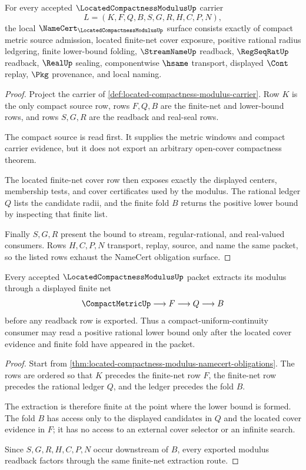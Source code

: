 \begin{theorem}
\label{thm:located-compactness-modulus-namecert-obligations}
For every accepted $\LocatedCompactnessModulusUp$ carrier
$$
L=(K,F,Q,B,S,G,R,H,C,P,N),
$$
the local $\NameCert_{\LocatedCompactnessModulusUp}$ surface consists exactly of compact metric source admission, located finite-net cover exposure, positive rational radius ledgering, finite lower-bound folding, $\StreamNameUp$ readback, $\RegSeqRatUp$ readback, $\RealUp$ sealing, componentwise $\hsame$ transport, displayed $\Cont$ replay, $\Pkg$ provenance, and local naming.
\end{theorem}
\begin{proof}
Project the carrier of \autoref{def:located-compactness-modulus-carrier}. Row $K$ is the only compact source row, rows $F,Q,B$ are the finite-net and lower-bound rows, and rows $S,G,R$ are the readback and real-seal rows.

The compact source is read first. It supplies the metric windows and compact carrier evidence, but it does not export an arbitrary open-cover compactness theorem.

The located finite-net cover row then exposes exactly the displayed centers, membership tests, and cover certificates used by the modulus. The rational ledger $Q$ lists the candidate radii, and the finite fold $B$ returns the positive lower bound by inspecting that finite list.

Finally $S,G,R$ present the bound to stream, regular-rational, and real-valued consumers. Rows $H,C,P,N$ transport, replay, source, and name the same packet, so the listed rows exhaust the NameCert obligation surface.
\end{proof}

\begin{theorem}
\label{thm:located-compactness-modulus-finite-net-extraction}
Every accepted $\LocatedCompactnessModulusUp$ packet extracts its modulus through a displayed finite net
$$
\CompactMetricUp \longrightarrow F \longrightarrow Q \longrightarrow B
$$
before any readback row is exported. Thus a compact-uniform-continuity consumer may read a positive rational lower bound only after the located cover evidence and finite fold have appeared in the packet.
\end{theorem}
\begin{proof}
Start from \autoref{thm:located-compactness-modulus-namecert-obligations}. The rows are ordered so that $K$ precedes the finite-net row $F$, the finite-net row precedes the rational ledger $Q$, and the ledger precedes the fold $B$.

The extraction is therefore finite at the point where the lower bound is formed. The fold $B$ has access only to the displayed candidates in $Q$ and the located cover evidence in $F$; it has no access to an external cover selector or an infinite search.

Since $S,G,R,H,C,P,N$ occur downstream of $B$, every exported modulus readback factors through the same finite-net extraction route.
\end{proof}

